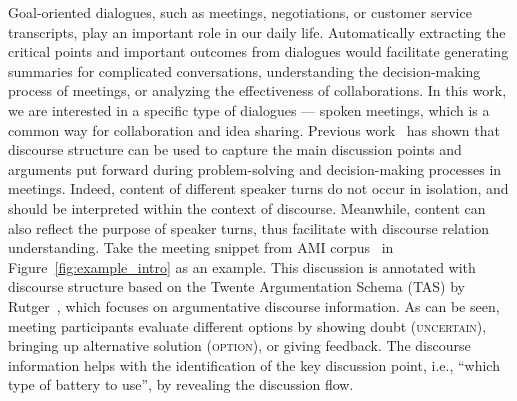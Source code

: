 Goal-oriented dialogues, such as meetings, negotiations, or customer service transcripts, play an important role in our daily life. Automatically extracting the critical points and important outcomes from dialogues would facilitate generating summaries for complicated conversations, understanding the decision-making process of meetings, or analyzing the effectiveness of collaborations. In this work, we are interested in a specific type of dialogues --- spoken meetings, which is a common way for collaboration and idea sharing. Previous work~\cite{kirschner2012visualizing} has shown that discourse structure can be used to capture the main discussion points and arguments put forward during problem-solving and decision-making processes in meetings. Indeed, content of different speaker turns do not occur in isolation, and should be interpreted within the context of discourse. Meanwhile, content can also reflect the purpose of speaker turns, thus facilitate with discourse relation understanding. Take the meeting snippet from AMI corpus~\cite{ami} in Figure~\ref{fig:example_intro} as an example. This discussion is annotated with discourse structure based on the Twente Argumentation Schema (TAS) by Rutger~\cite{so65562}, which focuses on argumentative discourse information. As can be seen, meeting participants evaluate different options by showing doubt (\textsc{uncertain}), bringing up alternative solution (\textsc{option}), or giving feedback. The discourse information helps with the identification of the key discussion point, i.e., ``which type of battery to use'', by revealing the discussion flow.




